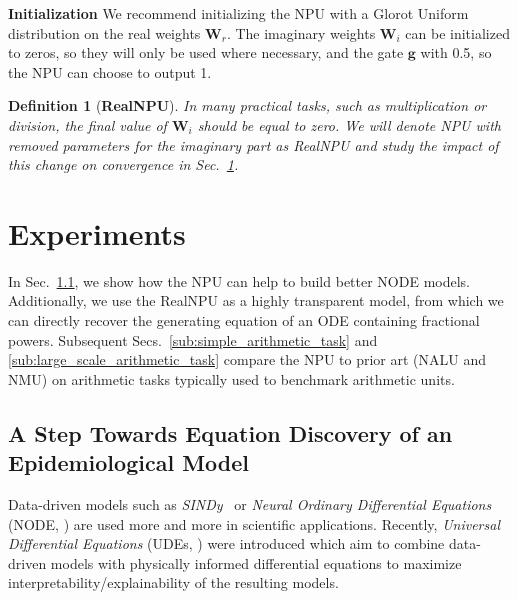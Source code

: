 \documentclass[9pt]{article}
\newtheorem*{definition}{Definition}
\newcommand{\Wre}{\bm W_{r}}
\newcommand{\Wim}{\bm W_{i}}
\begin{document}
\textbf{Initialization}%
\label{sub:initialization}
We recommend initializing the NPU with a Glorot Uniform distribution on the
real weights $\Wre$. The imaginary weights $\Wim$ can be initialized to zeros,
so they will only be used where necessary, and the gate $\bm g$ with 0.5, so
the NPU can choose to output 1.

\begin{definition}[\textbf{RealNPU}]
  In many practical tasks, such as multiplication or division, the final value
  of $\bm W_i$ should be equal to zero. We will denote NPU with removed
  parameters for the imaginary part as RealNPU and study the impact of this
  change on convergence in Sec.~\ref{sec:experiments}.
\end{definition}


\section{Experiments}%
\label{sec:experiments}

In Sec.~\ref{sub:fractional_sir_model}, we show how the NPU can help to build
better NODE models. Additionally, we use the RealNPU as a highly transparent
model, from which we can directly recover the generating equation of an ODE
containing fractional powers.  Subsequent
Secs.~\ref{sub:simple_arithmetic_task} and \ref{sub:large_scale_arithmetic_task}
compare the NPU to prior art (NALU and NMU) on arithmetic tasks typically used
to benchmark arithmetic units.

\subsection{A Step Towards Equation Discovery of an Epidemiological Model}%
\label{sub:fractional_sir_model}

Data-driven models such as \emph{SINDy}~\citep{champion_data-driven_2019} or
\emph{Neural Ordinary Differential Equations} (NODE, \cite{chen_neural_2019})
are used more and more in scientific applications.
Recently, \emph{Universal Differential Equations} (UDEs,
\cite{rackauckas_universal_2020}) were introduced which aim to combine
data-driven models with physically informed differential equations to maximize
interpretability/explainability of the resulting models.
\end{document}
